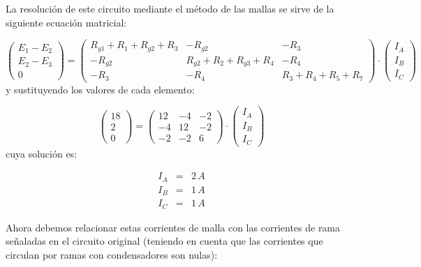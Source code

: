 \documentclass[10pt]{article}
\begin{document}
La resolución de este circuito mediante el método de las mallas se
sirve de la siguiente ecuación matricial:

\[
\left(\begin{array}{c}
E_{1}-E_{2}\\
E_{2}-E_{3}\\
0
\end{array}\right) = \left(\begin{array}{ccc}
R_{g1}+R_{1}+R_{g2}+R_{3} & -R_{g2} & -R_{3}\\
-R_{g2} & R_{g2}+R_{2}+R_{g3}+R_{4} & -R_{4}\\
-R_{3} & -R_{4} & R_{3}+R_{4}+R_{5}+R_{7}
\end{array}\right) \cdot \left(\begin{array}{c}
I_{A}\\
I_{B}\\
I_{C}
\end{array}\right)
\]
 y sustituyendo los valores de cada elemento:

\[
\left(\begin{array}{c}
18\\
2\\
0
\end{array}\right) = \left(\begin{array}{ccc}
12 & -4 & -2\\
-4 & 12 & -2\\
-2 & -2 & 6
\end{array}\right) \cdot \left(\begin{array}{c}
I_{A}\\
I_{B}\\
I_{C}
\end{array}\right)
\]
cuya solución es:

\begin{eqnarray*}
I_{A} & = & 2\, A\\
I_{B} & = & 1\, A\\
I_{C} & = & 1\, A
\end{eqnarray*}


Ahora debemos relacionar estas corrientes de malla con las corrientes
de rama señaladas en el circuito original (teniendo en cuenta que
las corrientes que circulan por ramas con condensadores son nulas):
\end{document}
